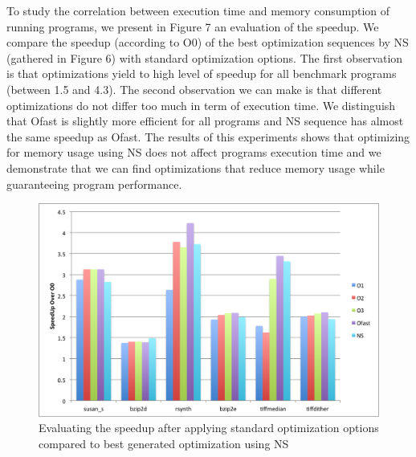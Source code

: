 To study the correlation between execution time and memory consumption of running programs, we present in Figure 7 an evaluation of the speedup. We compare the speedup (according to O0) of the best optimization sequences by NS (gathered in Figure 6) with standard optimization options. 
The first observation is that optimizations yield to high level of speedup for all benchmark programs (between 1.5 and 4.3).
The second observation we can make is that different optimizations do not differ too much in term of execution time. We  distinguish that Ofast is slightly more efficient for all programs and NS sequence has almost the same speedup as Ofast. 
The results of this experiments shows that optimizing for memory usage using NS does not affect programs execution time and we demonstrate that we can find optimizations that reduce memory usage while guaranteeing program performance.
\begin{figure}[!ht]
	\centering
	\includegraphics[width=1.\linewidth]{Ressources/infra_novelty_stat2.png}
	\caption{Evaluating the speedup after applying standard optimization options compared to best generated optimization using NS}
\end{figure}

\fi